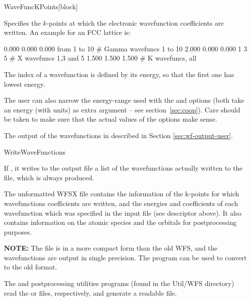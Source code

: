 \begin{fdfentry}{WaveFuncKPoints}[block]
  
  Specifies the $k$-points at which the electronic wavefunction
  coefficients are written.  An example for an FCC lattice is:
  \begin{fdfexample}
     0.000  0.000  0.000  from 1 to 10   # Gamma wavefuncs 1 to 10
     2.000  0.000  0.000  1 3 5          # X wavefuncs 1,3 and 5
     1.500  1.500  1.500                 # K wavefuncs, all
  \end{fdfexample}
  The index of a wavefunction is defined by its energy, so that the
  first one has lowest energy.

  The user can also narrow the energy-range used with the
   and  options (both take
  an energy (with units) as extra argument -- see
  section~\ref{sec:coop}). Care should be taken to make sure that the
  actual values of the options make sense.

  The output of the wavefunctions in described in Section
  \ref{sec:wf-output-user}.

\end{fdfentry}


\begin{fdflogicalF}{WriteWaveFunctions}

  If \fdftrue, it writes to the output file a list of the
  wavefunctions actually written to the  file,
  which is always produced.

\end{fdflogicalF}

The unformatted WFSX file contains the information of the
k-points for which wavefunctions coefficients are written, and the
energies and coefficients of each wavefunction which was specified in
the input file (see  descriptor above). It also contains information
on the atomic species and the orbitals for postprocessing purposes.

\textbf{NOTE:} The  file is in a more compact
form than the old WFS, and the wavefunctions are output in single
precision. The  program can be used to
convert to the old format.

\noindent
The  and
 postprocessing utilities programs
(found in the Util/WFS directory) read the  or
 files, respectively, and generate a readable file.



